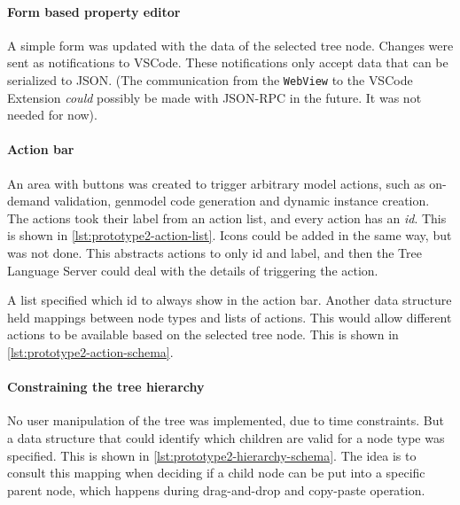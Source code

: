 

\paragraph*{Form based property editor}
A simple form was updated with the data of the selected tree node.
Changes were sent as notifications to VSCode.
These notifications only accept data that can be serialized to \gls{JSON}.
(The communication from the \texttt{WebView} to the \gls{VSCode} Extension \emph{could} possibly be made with \gls{JSON-RPC} in the future. It was not needed for now).

\paragraph*{Action bar}
An area with buttons was created to trigger arbitrary model actions, such as on-demand validation, genmodel code generation and dynamic instance creation.
The actions took their label from an action list, and every action has an \emph{id}. This is shown in \cref{lst:prototype2-action-list}.
Icons could be added in the same way, but was not done.
This abstracts actions to only id and label, and then the Tree Language Server could deal with the details of triggering the action.



A list specified which id to always show in the action bar.
Another data structure held mappings between node types and lists of actions.
This would allow different actions to be available based on the selected tree node. This is shown in \cref{lst:prototype2-action-schema}.




\paragraph*{Constraining the tree hierarchy}
No user manipulation of the tree was implemented, due to time constraints.
But a data structure that could identify which children are valid for a node type was specified.
This is shown in \cref{lst:prototype2-hierarchy-schema}.
The idea is to consult this mapping when deciding if a child node can be put into a specific parent node, which happens during drag-and-drop and copy-paste operation.


